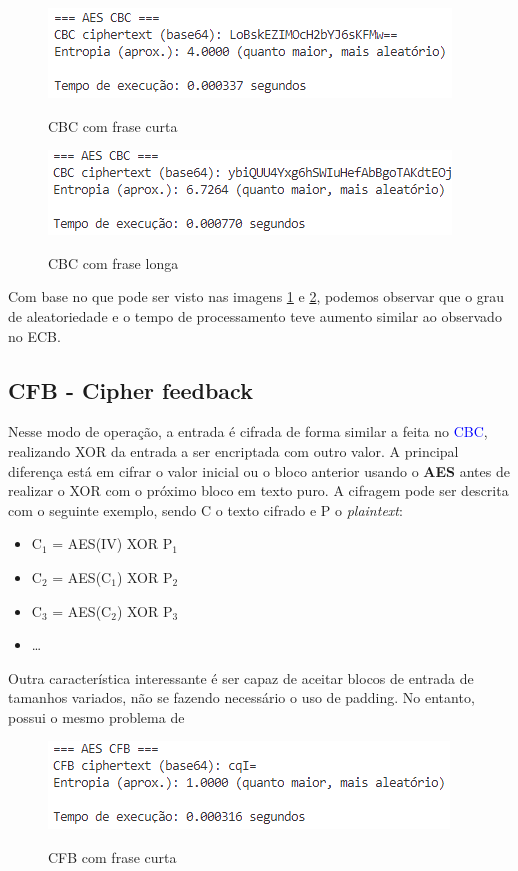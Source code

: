 \documentclass[12pt]{article}
\newcommand{\blue}[1]{\textcolor{blue}{#1}}
\begin{document}
\begin{figure}[h]
    \caption{CBC com frase curta}
    \centering
    \includegraphics[width = 0.5\linewidth]{Imagens/CBC-curto.png}  
    \label{fig:CBC Curto}
\end{figure}

\begin{figure}[h]
    \caption{CBC com frase longa}
    \centering
    \includegraphics[width = 0.5\linewidth]{Imagens/CBC-longo.png}  
    \label{fig:CBC Longo}
\end{figure}

Com base no que pode ser visto nas imagens \ref{fig:CBC Curto} e \ref{fig:CBC Longo}, podemos observar que o grau de aleatoriedade e o tempo de processamento teve aumento similar ao observado no ECB.

\subsection{CFB - Cipher feedback}
Nesse modo de operação, a entrada é cifrada de forma similar a feita no \blue{CBC}, realizando XOR da entrada a ser encriptada com outro valor. A principal diferença está em cifrar o valor inicial ou o bloco anterior usando o \textbf{AES} antes de realizar o XOR com o próximo bloco em texto puro. A cifragem pode ser descrita com o seguinte exemplo, sendo C o texto cifrado e P o \textit{plaintext}:
\begin{itemize}
  \item C$_{1}$ = AES(IV) XOR P$_{1}$
  \item C$_{2}$ = AES(C$_{1}$) XOR P$_{2}$
  \item C$_{3}$ = AES(C$_{2}$) XOR P$_{3}$
  \item \dots
\end{itemize}

Outra característica interessante é ser capaz de aceitar blocos de entrada de tamanhos variados, não se fazendo necessário o uso de padding. No entanto, possui o mesmo problema de 

\begin{figure}[h]
    \caption{CFB com frase curta}
    \centering
    \includegraphics[width = 0.5\linewidth]{Imagens/CFB-curto.png}  
    \label{fig:CFB Curto}
\end{figure}
\end{document}
